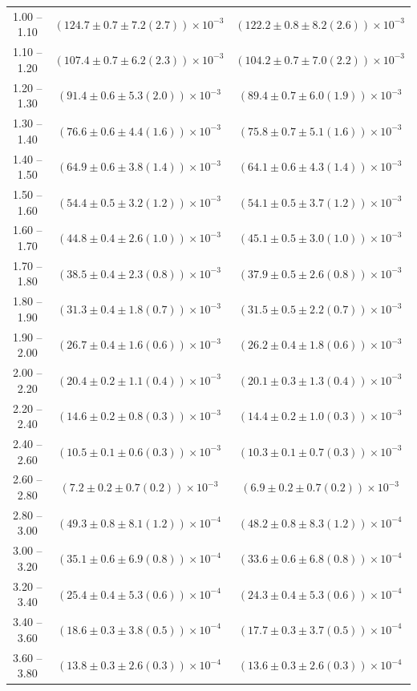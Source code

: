 \begin{table}
\begin{center}
\begin{tabular}{ c | c c }
1.00 -- 1.10 & $(124.7\pm0.7\pm7.2(2.7))\times10^{-3}$ & $(122.2\pm0.8\pm8.2(2.6))\times10^{-3}$ \\ 
1.10 -- 1.20 & $(107.4\pm0.7\pm6.2(2.3))\times10^{-3}$ & $(104.2\pm0.7\pm7.0(2.2))\times10^{-3}$ \\ 
1.20 -- 1.30 & $(91.4\pm0.6\pm5.3(2.0))\times10^{-3}$ & $(89.4\pm0.7\pm6.0(1.9))\times10^{-3}$ \\ 
1.30 -- 1.40 & $(76.6\pm0.6\pm4.4(1.6))\times10^{-3}$ & $(75.8\pm0.7\pm5.1(1.6))\times10^{-3}$ \\ 
1.40 -- 1.50 & $(64.9\pm0.6\pm3.8(1.4))\times10^{-3}$ & $(64.1\pm0.6\pm4.3(1.4))\times10^{-3}$ \\ 
1.50 -- 1.60 & $(54.4\pm0.5\pm3.2(1.2))\times10^{-3}$ & $(54.1\pm0.5\pm3.7(1.2))\times10^{-3}$ \\ 
1.60 -- 1.70 & $(44.8\pm0.4\pm2.6(1.0))\times10^{-3}$ & $(45.1\pm0.5\pm3.0(1.0))\times10^{-3}$ \\ 
1.70 -- 1.80 & $(38.5\pm0.4\pm2.3(0.8))\times10^{-3}$ & $(37.9\pm0.5\pm2.6(0.8))\times10^{-3}$ \\ 
1.80 -- 1.90 & $(31.3\pm0.4\pm1.8(0.7))\times10^{-3}$ & $(31.5\pm0.5\pm2.2(0.7))\times10^{-3}$ \\ 
1.90 -- 2.00 & $(26.7\pm0.4\pm1.6(0.6))\times10^{-3}$ & $(26.2\pm0.4\pm1.8(0.6))\times10^{-3}$ \\ 
2.00 -- 2.20 & $(20.4\pm0.2\pm1.1(0.4))\times10^{-3}$ & $(20.1\pm0.3\pm1.3(0.4))\times10^{-3}$ \\ 
2.20 -- 2.40 & $(14.6\pm0.2\pm0.8(0.3))\times10^{-3}$ & $(14.4\pm0.2\pm1.0(0.3))\times10^{-3}$ \\ 
2.40 -- 2.60 & $(10.5\pm0.1\pm0.6(0.3))\times10^{-3}$ & $(10.3\pm0.1\pm0.7(0.3))\times10^{-3}$ \\ 
2.60 -- 2.80 & $(7.2\pm0.2\pm0.7(0.2))\times10^{-3}$ & $(6.9\pm0.2\pm0.7(0.2))\times10^{-3}$ \\ 
2.80 -- 3.00 & $(49.3\pm0.8\pm8.1(1.2))\times10^{-4}$ & $(48.2\pm0.8\pm8.3(1.2))\times10^{-4}$ \\ 
3.00 -- 3.20 & $(35.1\pm0.6\pm6.9(0.8))\times10^{-4}$ & $(33.6\pm0.6\pm6.8(0.8))\times10^{-4}$ \\ 
3.20 -- 3.40 & $(25.4\pm0.4\pm5.3(0.6))\times10^{-4}$ & $(24.3\pm0.4\pm5.3(0.6))\times10^{-4}$ \\ 
3.40 -- 3.60 & $(18.6\pm0.3\pm3.8(0.5))\times10^{-4}$ & $(17.7\pm0.3\pm3.7(0.5))\times10^{-4}$ \\ 
3.60 -- 3.80 & $(13.8\pm0.3\pm2.6(0.3))\times10^{-4}$ & $(13.6\pm0.3\pm2.6(0.3))\times10^{-4}$ \\ 

\end{tabular}
\end{center}
\end{table}
